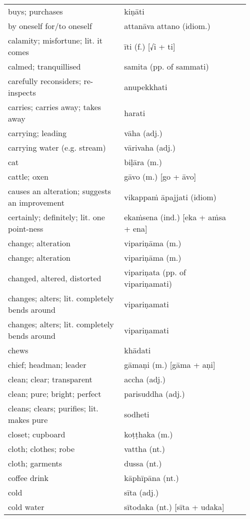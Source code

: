 \documentclass[a5paper]{memoir}
\begin{document}
\begin{longtable}{L{0.48\linewidth} L{0.48\linewidth} H}
buys; purchases & kiṇāti & \\[0pt]
by oneself for/to oneself & attanāva attano (idiom.) & \\[0pt]
calamity; misfortune; lit. it comes & īti (f.) [√i + ti] & \\[0pt]
calmed; tranquillised & samita (pp. of sammati) & \\[0pt]
carefully reconsiders; re-inspects & anupekkhati & \\[0pt]
carries; carries away; takes away & harati & \\[0pt]
carrying; leading & vāha (adj.) & \\[0pt]
carrying water (e.g. stream) & vārivaha (adj.) & \\[0pt]
cat & biḷāra (m.) & \\[0pt]
cattle; oxen & gāvo (m.) [go + āvo] & \\[0pt]
causes an alteration; suggests an improvement & vikappaṁ āpajjati (idiom) & \\[0pt]
certainly; definitely; lit. one point-ness & ekaṁsena (ind.) [eka + aṁsa + ena] & \\[0pt]
change; alteration & vipariṇāma (m.) & \\[0pt]
change; alteration & vipariṇāma (m.) & \\[0pt]
changed, altered, distorted & vipariṇata (pp. of vipariṇamati) & \\[0pt]
changes; alters; lit. completely bends around & vipariṇamati & \\[0pt]
changes; alters; lit. completely bends around & vipariṇamati & \\[0pt]
chews & khādati & \\[0pt]
chief; headman; leader & gāmaṇi (m.) [gāma + aṇi] & \\[0pt]
clean; clear; transparent & accha (adj.) & \\[0pt]
clean; pure; bright; perfect & parisuddha (adj.) & \\[0pt]
cleans; clears; purifies; lit. makes pure & sodheti & \\[0pt]
closet; cupboard & koṭṭhaka (m.) & \\[0pt]
cloth; clothes; robe & vattha (nt.) & \\[0pt]
cloth; garments & dussa (nt.) & \\[0pt]
coffee drink & kāphīpāna (nt.) & \\[0pt]
cold & sīta (adj.) & \\[0pt]
cold water & sītodaka (nt.) [sīta + udaka] & \\[0pt]

\end{longtable}
\end{document}
